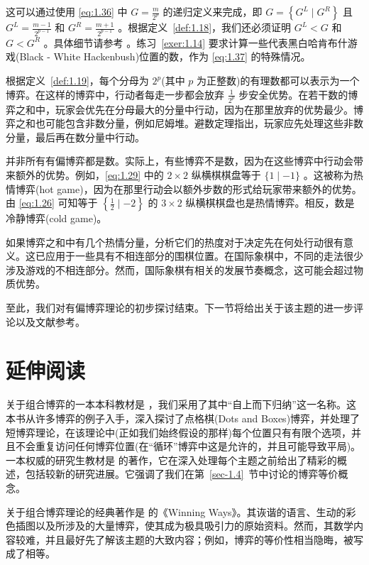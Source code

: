 这可以通过使用 \eqref{eq:1.36} 中 \(G = \frac{m}{{2}^{p}}\) 的递归定义来完成，即 \(G = \left\{  {{G}^{L} \mid  {G}^{R}}\right\}\) 且 \({G}^{L} = \frac{m - 1}{{2}^{p - 1}}\) 和 \({G}^{R} = \frac{m + 1}{{2}^{p - 1}}\) 。根据定义~\ref{def:1.18}，我们还必须证明 \({G}^{L} < G\) 和 \(G < {G}^{R}\) 。具体细节请参考 \citet*[Chapters~4 and~5]{albert2007}。练习~\ref{exer:1.14} 要求计算一些代表黑白哈肯布什游戏(Black - White Hackenbush)位置的数，作为 \eqref{eq:1.37} 的特殊情况。

根据定义~\ref{def:1.19}，每个分母为 \({2}^{p}\)(其中 \(p\) 为正整数)的有理数都可以表示为一个博弈。在这样的博弈中，行动者每走一步都会放弃 \(\frac{1}{{2}^{p}}\) 步安全优势。在若干数的博弈之和中，玩家会优先在分母最大的分量中行动，因为在那里放弃的优势最少。博弈之和也可能包含非数分量，例如尼姆堆。避数定理指出，玩家应先处理这些非数分量，最后再在数分量中行动。

并非所有有偏博弈都是数。实际上，有些博弈不是数，因为在这些博弈中行动会带来额外的优势。例如，\eqref{eq:1.29} 中的 \(2 \times  2\) 纵横棋棋盘等于 \(\{ 1 \mid   - 1\}\) 。这被称为热情博弈(hot game)，因为在那里行动会以额外步数的形式给玩家带来额外的优势。由 \eqref{eq:1.26} 可知等于 \(\left\{  {\frac{1}{2} \mid   - 2}\right\}\) 的 \(3 \times  2\) 纵横棋棋盘也是热情博弈。相反，数是冷静博弈(cold game)。

如果博弈之和中有几个热情分量，分析它们的热度对于决定先在何处行动很有意义。这已应用于一些具有不相连部分的围棋位置。在国际象棋中，不同的走法很少涉及游戏的不相连部分。然而，国际象棋有相关的发展节奏概念，这可能会超过物质优势。

至此，我们对有偏博弈理论的初步探讨结束。下一节将给出关于该主题的进一步评论以及文献参考。

\section{延伸阅读}\label{sec-1.9}

关于组合博弈的一本本科教材是 \citet*{albert2007}，我们采用了其中“自上而下归纳”这一名称。这本书从许多博弈的例子入手，深入探讨了点格棋(Dots and Boxes)博弈，并处理了短博弈理论，在该理论中(正如我们始终假设的那样)每个位置只有有限个选项，并且不会重复访问任何博弈位置(在“循环”博弈中这是允许的，并且可能导致平局)。一本权威的研究生教材是 \citet{siegel2013} 的著作，它在深入处理每个主题之前给出了精彩的概述，包括较新的研究进展。它强调了我们在第~\ref{sec-1.4}~节中讨论的博弈等价概念。

关于组合博弈理论的经典著作是 \citet*{berlekamp2001} 的《Winning Ways》。其诙谐的语言、生动的彩色插图以及所涉及的大量博弈，使其成为极具吸引力的原始资料。然而，其数学内容较难，并且最好先了解该主题的大致内容；例如，博弈的等价性相当隐晦，被写成了相等。

